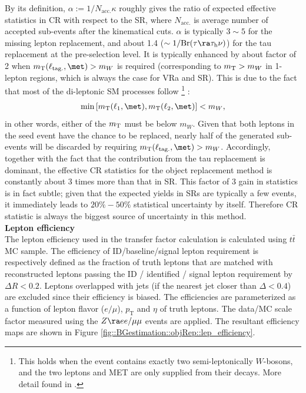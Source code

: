 By its definition, $\alpha := 1/N_{\mathrm{acc.}}\kappa$ roughly gives the ratio of expected effective statistics in CR with respect to the SR, where $N_{\mathrm{acc.}}$ is average number of accepted sub-events after the kinematical cuts. $\alpha$ is typically $3\sim5$ for the missing lepton replacement, and about 1.4 ($\sim 1/\mathrm{Br}(\tau\ra\tau_{\mathrm{h}}\nu)$) for the tau replacement at the pre-selection level. It is typically enhanced by about factor of 2 when $\mt(\ell_{\mathrm{tag.}},\met)>m_W$ is required (corresponding to $m_{\mathrm{T}}>m_W$ in 1-lepton regions, which is always the case for VRa and SR). This is due to the fact that most of the di-leptonic SM processes follow 
\footnote{This holds when the event contains exactly two semi-leptonically $W$-bosons, and the two leptons and MET are only supplied from their decays. More detail found in \cite{MT2_Lester_Summers}.} :
\begin{align}
\min \left[ \mt(\ell_1,\met),\mt(\ell_2,\met) \right] < m_W, \label{eq::MT2condition}
\end{align}
in other words, either of the $m_{\mathrm{T}}$ must be below $m_W$. 
Given that both leptons in the seed event have the chance to be replaced,  
nearly half of the generated sub-events will be discarded by requiring $\mt(\ell_{\mathrm{tag.}},\met)>m_W$.
Accordingly, together with the fact that the contribution from the tau replacement is dominant, the effective CR statistics for the object replacement method is constantly about 3 times more than that in SR. This factor of 3 gain in statistics is in fact subtle; given that the expected yields in SRs are typically a few events, it immediately leads to $20\%-50\%$ statistical uncertainty by itself. Therefore CR statistic is always the biggest source of uncertainty in this method. \\


\noindent \textbf{Lepton efficiency} \\
The lepton efficiency used in the transfer factor calculation is calculated using $t\bar{t}$ MC sample. The efficiency of ID/baseline/signal lepton requirement is respectively defined as the fraction of truth leptons that are matched with reconstructed leptons passing the ID / identified / signal lepton requirement by $\Delta R<0.2$. Leptons overlapped with jets (if the nearest jet closer than $\Delta<0.4$) are excluded since their efficiency is biased. The efficiencies are parameterized as a function of lepton flavor ($e/\mu$), $p_{\mathrm{T}}$ and $\eta$ of truth leptons. The data/MC scale factor measured using the $Z\ra ee/\mu\mu$ events are applied. The resultant efficiency maps are shown in Figure \ref{fig::BGestimation::objRep::lep_efficiency}. \\

